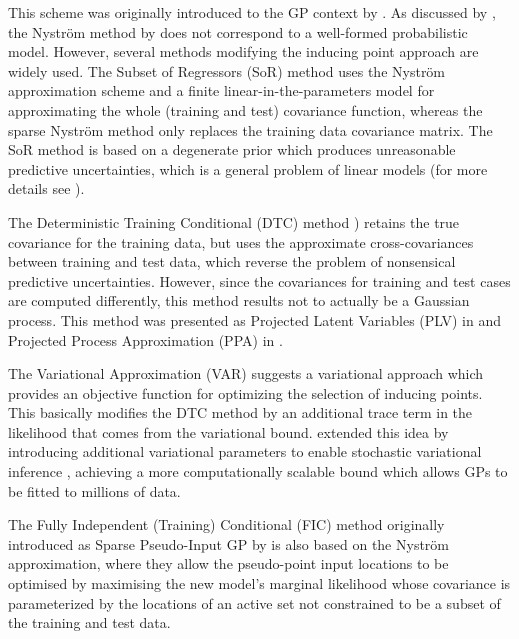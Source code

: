 \documentclass[]{interact}
\theoremstyle{plain}%
\theoremstyle{definition}
\theoremstyle{remark}
\begin{document}
This scheme was originally introduced to the GP context by \cite{williams2001using}. As discussed by \cite{quinonero2005unifying}, the Nystr\"om method by \cite{williams2001using} does not correspond to a well-formed probabilistic model. However, several methods modifying the inducing point approach are widely used. The Subset of Regressors (SoR) \citep{smola2001sparse} method uses the Nystr\"om approximation scheme and a finite linear-in-the-parameters model for approximating the whole (training and test) covariance function, whereas the sparse Nystr\"om method \citep{williams2001using} only replaces the training data covariance matrix. The SoR method is based on a degenerate prior which produces unreasonable predictive uncertainties, which is a general problem of linear models (for more details see \cite{rasmussen2006gaussian}). 

The Deterministic Training Conditional (DTC) method \citep{ro2001sparse,seeger2003fast}) retains the true covariance for the training data, but uses the approximate cross-covariances between training and test data, which reverse the problem of nonsensical predictive uncertainties. However, since the covariances for training and test cases are computed differently, this method results not to actually be a Gaussian process. This method was presented as Projected Latent Variables (PLV) in \cite{seeger2003fast} and Projected Process Approximation (PPA) in \cite{rasmussen2006gaussian}. 

The Variational Approximation (VAR) \citep{titsias2009variational} suggests a variational approach which provides an objective function for optimizing the selection of inducing points. This basically modifies the DTC method by an additional trace term in the likelihood that comes from the variational bound.  \cite{hensman2013gaussian} extended this idea by introducing additional variational parameters to enable stochastic variational inference \citep{hoffman2013stochastic}, achieving a more computationally scalable bound which allows GPs to be fitted to millions of data.

The Fully Independent (Training) Conditional (FIC) \citep{quinonero2005unifying} method originally introduced as Sparse Pseudo-Input GP by \cite{snelson2006sparse} is also based on the Nystr\"om approximation, where they allow the pseudo-point input locations to be optimised by maximising the new model's marginal likelihood whose covariance is parameterized by the locations of an active set not constrained to be a subset of the training and test data.
\end{document}

